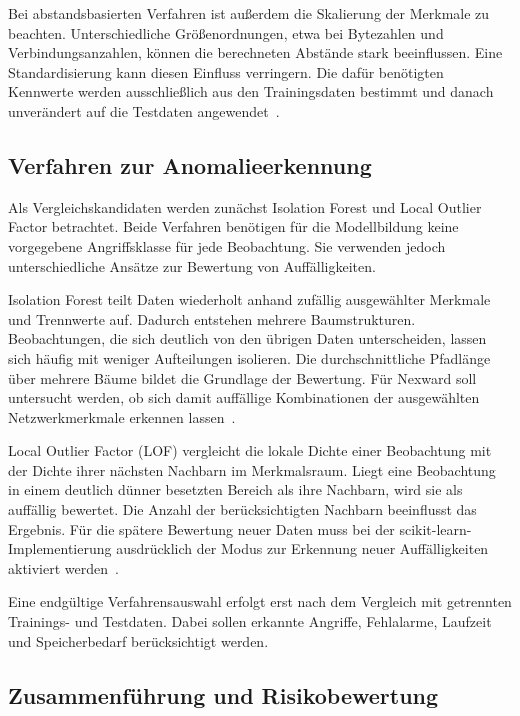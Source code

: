 Bei abstandsbasierten Verfahren ist außerdem die Skalierung der Merkmale zu beachten. Unterschiedliche Größenordnungen, etwa bei Bytezahlen und Verbindungsanzahlen, können die berechneten Abstände stark beeinflussen. Eine Standardisierung kann diesen Einfluss verringern. Die dafür benötigten Kennwerte werden ausschließlich aus den Trainingsdaten bestimmt und danach unverändert auf die Testdaten angewendet~\cite{raichle-sklearn-preprocessing}.

\subsection{Verfahren zur Anomalieerkennung}

Als Vergleichskandidaten werden zunächst Isolation Forest und Local Outlier Factor betrachtet. Beide Verfahren benötigen für die Modellbildung keine vorgegebene Angriffsklasse für jede Beobachtung. Sie verwenden jedoch unterschiedliche Ansätze zur Bewertung von Auffälligkeiten.

Isolation Forest teilt Daten wiederholt anhand zufällig ausgewählter Merkmale und Trennwerte auf. Dadurch entstehen mehrere Baumstrukturen. Beobachtungen, die sich deutlich von den übrigen Daten unterscheiden, lassen sich häufig mit weniger Aufteilungen isolieren. Die durchschnittliche Pfadlänge über mehrere Bäume bildet die Grundlage der Bewertung. Für Nexward soll untersucht werden, ob sich damit auffällige Kombinationen der ausgewählten Netzwerkmerkmale erkennen lassen~\cite{raichle-isolation-forest}.

Local Outlier Factor (LOF) vergleicht die lokale Dichte einer Beobachtung mit der Dichte ihrer nächsten Nachbarn im Merkmalsraum. Liegt eine Beobachtung in einem deutlich dünner besetzten Bereich als ihre Nachbarn, wird sie als auffällig bewertet. Die Anzahl der berücksichtigten Nachbarn beeinflusst das Ergebnis. Für die spätere Bewertung neuer Daten muss bei der scikit-learn-Implementierung ausdrücklich der Modus zur Erkennung neuer Auffälligkeiten aktiviert werden~\cite{raichle-lof}.

Eine endgültige Verfahrensauswahl erfolgt erst nach dem Vergleich mit getrennten Trainings- und Testdaten. Dabei sollen erkannte Angriffe, Fehlalarme, Laufzeit und Speicherbedarf berücksichtigt werden.

\subsection{Zusammenführung und Risikobewertung}

